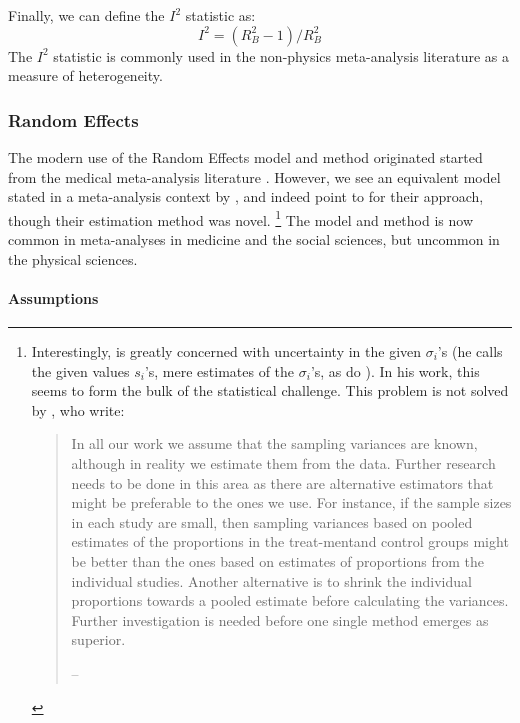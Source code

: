 \documentclass[letterpaper,12pt]{article}
\begin{document}
Finally, we can define the $I^2$ statistic as:
\[I^2=(R_B^2-1)/R_B^2\]
The $I^2$ statistic is commonly used in the non-physics meta-analysis literature as a measure of heterogeneity.


\subsubsection{Random Effects}\label{sec:re}

The modern use of the Random Effects model and method originated started from the medical meta-analysis literature \citep{dersimonian1986meta}. However, we see an equivalent model stated in a meta-analysis context by \citet{cochran1937problems}, and indeed \citet{dersimonian2015meta} point to \citet{cochran1954combination} for their approach, though their estimation method was novel.
\footnote{Interestingly, \citet{cochran1937problems,cochran1954combination} is greatly concerned with uncertainty in the given $\sigma_i$'s (he calls the given values $s_i$'s, mere estimates of the $\sigma_i$'s, as do \citet{dersimonian1986meta}). In his work, this seems to form the bulk of the statistical challenge. This problem is not solved by \citet{dersimonian1986meta}, who write:
\begin{quote}
In all our work we assume that the sampling variances are known, although in reality we estimate them from the data. Further research needs to be done in this area as there are alternative estimators that might be preferable to the ones we use. For instance, if the sample sizes in each study are small, then sampling variances based on pooled estimates of the proportions in the treat-mentand control groups might be better than the ones based on estimates of proportions from the individual studies. Another alternative is to shrink the individual proportions towards a pooled estimate before calculating the variances. Further investigation is needed before one single method emerges as superior.

\hfill{}--\citet{dersimonian1986meta}
\end{quote}
} The model and method is now common in meta-analyses in medicine and the social sciences, but uncommon in the physical sciences.

\paragraph{Assumptions}\label{assumptions}
\end{document}
